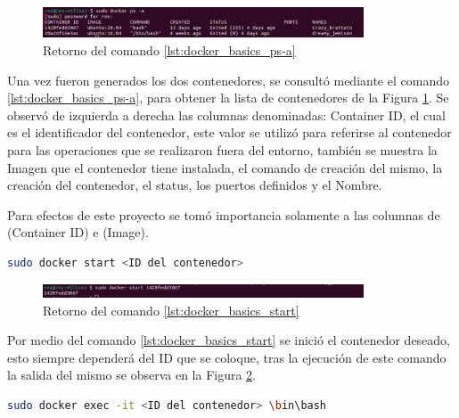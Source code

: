 \begin{figure}[h!]
    \centering
    \includegraphics[width=0.85\textwidth]{fig/especifico_2/retornos_de_comandos/sudo_docker_ps_a.pdf}
    \caption{Retorno del comando \ref{lst:docker_basics_ps-a}}
    \label{fig:sudo_docker_ps_a}
\end{figure}

Una vez fueron generados los dos contenedores, se consultó mediante el comando \ref{lst:docker_basics_ps-a}, para obtener la lista de contenedores de la Figura \ref{fig:sudo_docker_ps_a}. Se observó de izquierda a derecha las columnas denominadas: Container ID, el cual es el identificador del contenedor, este valor se utilizó para referirse al contenedor para las operaciones que se realizaron fuera del entorno, también se muestra la Imagen que el contenedor tiene instalada, el comando de creación del mismo, la creación del contenedor, el status, los puertos definidos y el Nombre.

Para efectos de este proyecto se tomó importancia solamente a las columnas de (Container ID) e (Image).

\begin{lstlisting}[language=bash, caption={Iniciar un contenedor, Docker}, label=lst:docker_basics_start]
    sudo docker start <ID del contenedor>
\end{lstlisting}

\begin{figure}[h!]
    \centering
    \includegraphics[width=0.85\textwidth]{fig/especifico_2/retornos_de_comandos/sudo_docker_start.pdf}
    \caption{Retorno del comando \ref{lst:docker_basics_start}}
    \label{fig:sudo_docker_start}
\end{figure}

Por medio del comando \ref{lst:docker_basics_start} se inició el contenedor deseado, esto siempre dependerá del ID que se coloque, tras la ejecución de este comando la salida del mismo se observa en la Figura \ref{fig:sudo_docker_start}.

\begin{lstlisting}[language=bash, caption={Ingresar a un contenedor, Docker}, label=lst:docker_basics_init]
    sudo docker exec -it <ID del contenedor> \bin\bash
\end{lstlisting}

